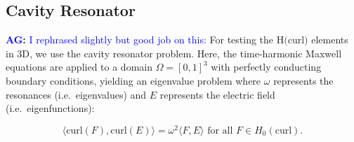 \documentclass[manuscript,screen]{acmart}
\newcommand{\R}{\mathbb{R}}
\newcommand{\akg}[1]{\textcolor{blue}{\textbf{AG:} #1}}
\begin{document}



  
\newpage
  \subsection{Cavity Resonator}

\noindent \akg{I rephrased slightly but good job on this:} For testing the H$($curl$)$ elements in 3D, we use the cavity resonator problem.  Here, the time-harmonic Maxwell equations are applied to a domain $\Omega = [0,1]^3$ with perfectly conducting boundary conditions, yielding an eigenvalue problem where $\omega$ represents the resonances (i.e.\ eigenvalues) and $E$ represents the electric field (i.e.\ eigenfunctions):


\begin{equation}
    \langle \text{curl}(F), \text{curl}(E) \rangle = \omega^2 \langle F, E \rangle \text{ for all } F \in H_0(\text{curl}).
\end{equation}

\end{document}
